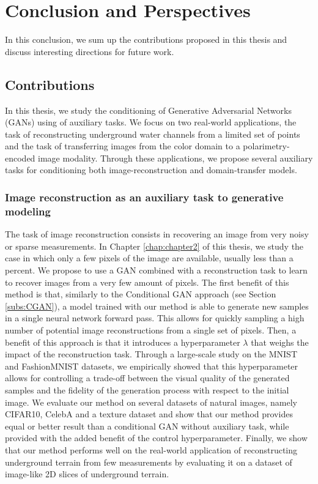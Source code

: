 \chapter{Conclusion and Perspectives}
\label{chap:conclusion}

In this conclusion, we sum up the contributions proposed in this thesis and discuss interesting directions for future work.

\section*{Contributions}

In this thesis, we study the conditioning of Generative Adversarial Networks (\ac{GANs}) using of auxiliary tasks. We focus on two real-world applications, the task of reconstructing underground water channels from a limited set of points and the task of transferring images from the color domain to a polarimetry-encoded image modality.  Through these applications, we propose several auxiliary tasks for conditioning both image-reconstruction and domain-transfer models.

\subsection*{Image reconstruction as an auxiliary task to generative modeling}

The task of image reconstruction consists in recovering an image from very noisy or sparse measurements. In Chapter \ref{chap:chapter2} of this thesis, we study the case in which only a few pixels of the image are available, usually less than a percent. We propose to use a \ac{GAN} combined with a reconstruction task to learn to recover images from a very few amount of pixels. The first benefit of this method is that, similarly to the Conditional GAN approach (see Section \ref{subs:CGAN}), a model trained with our method is able to generate new samples in a single neural network forward pass. This allows for quickly sampling a high number of potential image reconstructions from a single set of pixels. Then, a benefit of this approach is that it introduces a hyperparameter $\lambda$ that weighs the impact of the reconstruction task. Through a large-scale study on the MNIST and FashionMNIST datasets, we empirically showed that this hyperparameter allows for controlling a trade-off between the visual quality of the generated samples and the fidelity of the generation process with respect to the initial image. We evaluate our method on several datasets of natural images, namely CIFAR10, CelebA and a texture dataset and show that our method provides equal or better result than a conditional GAN without auxiliary task, while provided with the added benefit of the control hyperparameter. Finally, we show that our method performs well on the real-world application of reconstructing underground terrain from few measurements by evaluating it on a dataset of image-like 2D slices of underground terrain.

